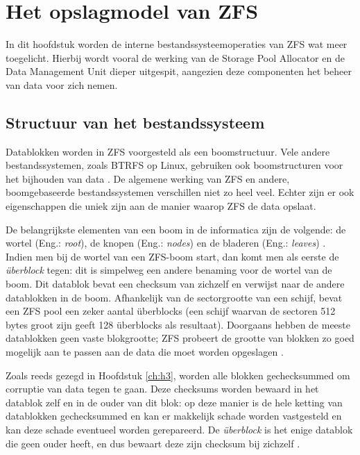 

\chapter{Het opslagmodel van ZFS}
\label{ch:h4}

In dit hoofdstuk worden de interne bestandssysteemoperaties van ZFS wat meer toegelicht. Hierbij wordt vooral de werking van de Storage Pool Allocator en de Data Management Unit dieper uitgespit, aangezien deze componenten het beheer van data voor zich nemen.

\section{Structuur van het bestandssysteem}

Datablokken worden in ZFS voorgesteld als een boomstructuur. Vele andere bestandssystemen, zoals BTRFS op Linux, gebruiken ook boomstructuren voor het bijhouden van data \autocite{Project2017a}. De algemene werking van ZFS en andere, boomgebaseerde bestandssystemen verschillen niet zo heel veel. Echter zijn er ook eigenschappen die uniek zijn aan de manier waarop ZFS de data opslaat.

De belangrijkste elementen van een boom in de informatica zijn de volgende: de wortel (Eng.: \textit{root}), de knopen (Eng.: \textit{nodes}) en de bladeren (Eng.: \textit{leaves}) \autocite{Cohen}. Indien men bij de wortel van een ZFS-boom start, dan komt men als eerste de \textit{\"{u}berblock} tegen: dit is simpelweg een andere benaming voor de wortel van de boom. Dit datablok bevat een \gls{checksum} van zichzelf en verwijst naar de andere datablokken in de boom. Afhankelijk van de sectorgrootte van een schijf, bevat een ZFS pool een zeker aantal \"{u}berblocks (een schijf waarvan de sectoren 512 bytes groot zijn geeft 128 \"{u}berblocks als resultaat). Doorgaans hebben de meeste datablokken geen vaste blokgrootte; ZFS probeert de grootte van blokken zo goed mogelijk aan te passen aan de data die moet worden opgeslagen \autocite{Lucas2015}.

Zoals reeds gezegd in Hoofdstuk \ref{ch:h3}, worden alle blokken gechecksummed om corruptie van data tegen te gaan. Deze checksums worden bewaard in het datablok zelf en in de ouder van dit blok: op deze manier is de hele ketting van datablokken gechecksummed en kan er makkelijk schade worden vastgesteld en kan deze schade eventueel worden gerepareerd. De \textit{\"{u}berblock} is het enige datablok die geen ouder heeft, en dus bewaart deze zijn \gls{checksum} bij zichzelf \autocite{ZFSBonwick}.  

